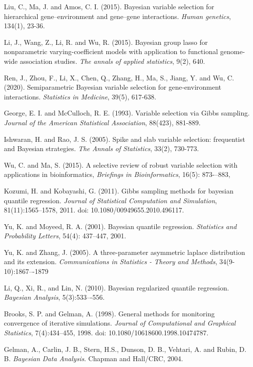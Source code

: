 \documentclass[12pt]{article}
\begin{document}
\begin{thebibliography}{99}
Liu, C., Ma, J. and Amos, C. I. (2015). Bayesian variable selection for hierarchical gene–environment and gene–gene interactions. \emph{Human genetics}, 134(1), 23-36.

Li, J., Wang, Z., Li, R. and Wu, R. (2015). Bayesian group lasso for nonparametric varying-coefficient models with application to functional genome-wide association studies. \emph{The annals of applied statistics}, 9(2), 640.

Ren, J., Zhou, F., Li, X., Chen, Q., Zhang, H., Ma, S., Jiang, Y. and Wu, C. (2020). Semiparametric Bayesian variable selection for gene‐environment interactions.
 \emph{Statistics in Medicine}, 39(5), 617-638.

George, E. I. and McCulloch, R. E. (1993). Variable selection via Gibbs sampling. \emph{Journal of the American Statistical Association}, 88(423), 881-889.

Ishwaran, H. and Rao, J. S. (2005). Spike and slab variable selection: frequentist and Bayesian strategies. \emph{The Annals of Statistics}, 33(2), 730-773.

 Wu, C. and Ma, S. (2015). A selective review of robust variable selection with applications in bioinformatics, \emph{Briefings in Bioinformatics}, 16(5): 873-–883, 

Kozumi,  H. and Kobayashi, G. (2011). Gibbs sampling methods for bayesian quantile regression.  \emph{Journal of Statistical Computation and Simulation}, 81(11):1565–1578, 2011. doi: 10.1080/00949655.2010.496117. 

Yu, K. and Moyeed, R. A. (2001). Bayesian quantile regression.  \emph{Statistics and Probability Letters}, 54(4): 437–447, 2001.

Yu, K. and Zhang, J. (2005). A three-parameter asymmetric laplace distribution and its extension.   \emph{Communications in Statistics - Theory and Methods}, 34(9-10):1867–-1879

Li, Q., Xi, R., and Lin, N. (2010). Bayesian regularized quantile regression.   \emph{Bayesian Analysis}, 5(3):533–-556.

Brooks, S. P. and Gelman, A.  (1998). General methods for monitoring convergence of iterative simulations.  \emph{Journal of Computational and Graphical Statistics}, 7(4):434–455, 1998. doi: 10.1080/10618600.1998.10474787.

Gelman, A., Carlin, J. B., Stern, H.S., Dunson, D. B., Vehtari, A. and Rubin, D. B. \emph{Bayesian Data Analysis}. Chapman and Hall/CRC, 2004.


\end{thebibliography}
\end{document}
